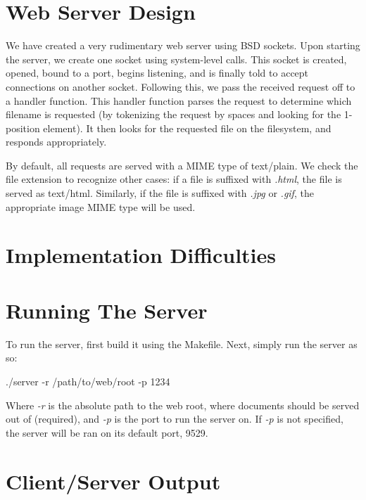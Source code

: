 \documentclass[12pt]{article}
\begin{document}
\maketitle

\section{Web Server Design}
We have created a very rudimentary web server using BSD sockets. Upon starting the server, we create one socket using system-level calls. This socket is created, opened, bound to a port, begins listening, and is finally told to accept connections on another socket. Following this, we pass the received request off to a handler function. This handler function parses the request to determine which filename is requested (by tokenizing the request by spaces and looking for the 1-position element). It then looks for the requested file on the filesystem, and responds appropriately.

By default, all requests are served with a MIME type of text/plain. We check the file extension to recognize other cases: if a file is suffixed with \emph{.html}, the file is served as text/html. Similarly, if the file is suffixed with \emph{.jpg} or \emph{.gif}, the appropriate image MIME type will be used.

\section{Implementation Difficulties}

\section{Running The Server}
To run the server, first build it using the Makefile.
Next, simply run the server as so:

./server -r /path/to/web/root -p 1234

Where \emph{-r} is the absolute path to the web root, where documents should be served out of (required), and \emph{-p} is the port to run the server on. If \emph{-p} is not specified, the server will be ran on its default port, 9529.

\section{Client/Server Output}
\end{document}
